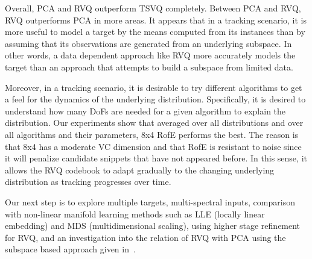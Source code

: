 Overall, PCA and RVQ outperform TSVQ completely.  Between PCA and RVQ, RVQ outperforms PCA in more areas.  It appears that in a tracking scenario, it is more useful to model a target by the means computed from its instances than by assuming that its observations are generated from an underlying subspace.  In other words, a data dependent approach like RVQ more accurately models the target than an approach that attempts to build a subspace from limited data.

Moreover, in a tracking scenario, it is desirable to try different algorithms to get a feel for the dynamics of the underlying distribution.  Specifically, it is desired to understand how many DoFs are needed for a given algorithm to explain the distribution.  Our experiments show that averaged over all distributions and over all algorithms and their parameters, 8x4 RofE performs the best.  The reason is that 8x4 has a moderate VC dimension and that RofE is resistant to noise since it will penalize candidate snippets that have not appeared before.  In this sense, it allows the RVQ codebook to adapt gradually to the changing underlying distribution as tracking progresses over time.

Our next step is to explore multiple targets, multi-spectral inputs, comparison with non-linear manifold learning methods such as LLE (locally linear embedding) and MDS (multidimensional scaling), using higher stage refinement for RVQ, and an investigation into the relation of RVQ with PCA using the subspace based approach given in~\cite{2004_CNF_KmeansVsPCA_DingHe}.